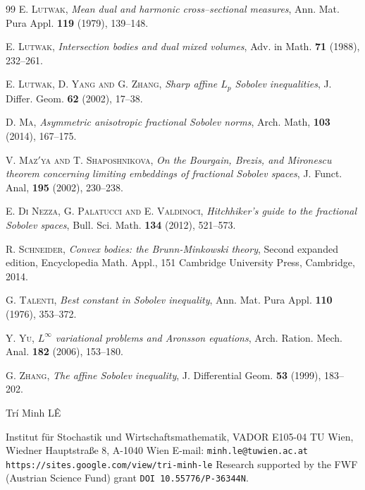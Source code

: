 \documentclass[11pt, reqno]{article}
\theoremstyle{definition}
\numberwithin{equation}{section}
\begin{document}
\begin{thebibliography}{99}
\textsc{E. Lutwak},
\emph{Mean dual and harmonic cross--sectional measures},
Ann. Mat. Pura Appl. \textbf{119} (1979), 139--148.

\textsc{E. Lutwak},
\emph{Intersection bodies and dual mixed volumes},
Adv. in Math. \textbf{71} (1988), 232--261.

\textsc{E. Lutwak, D. Yang and G. Zhang},
\emph{Sharp affine $L_p$ Sobolev inequalities},
J. Differ. Geom. \textbf{62} (2002), 17--38.

\textsc{D. Ma},
\emph{Asymmetric anisotropic fractional Sobolev norms},
Arch. Math, \textbf{103} (2014), 167--175.

\textsc{V. Maz$'$ya and T. Shaposhnikova,}
\emph{On the {B}ourgain, {B}rezis, and {M}ironescu theorem concerning limiting embeddings of fractional {S}obolev spaces},
J. Funct. Anal, \textbf{195} (2002), 230--238.

\textsc{E. Di Nezza, G. Palatucci and E. Valdinoci},
\emph{Hitchhiker{'}s guide to the fractional Sobolev spaces},
Bull. Sci. Math. \textbf{134} (2012), 521--573.

\textsc{R. Schneider},
\emph{Convex bodies: the Brunn-Minkowski theory},
Second expanded edition, Encyclopedia Math. Appl., 151
Cambridge University Press, Cambridge, 2014.

\textsc{G. Talenti},
\emph{Best constant in Sobolev inequality},
Ann. Mat. Pura Appl. \textbf{110} (1976), 353--372.

\textsc{Y. Yu},
\emph{{$L^\infty$} variational problems and {A}ronsson equations},
Arch. Ration. Mech. Anal. \textbf{182} (2006), 
153--180.

\textsc{G. Zhang},
\emph{The affine {S}obolev inequality},
J. Differential Geom. \textbf{53} (1999), 183--202.

\end{thebibliography}


\noindent Tr\'i Minh L\^E

\medskip

\noindent Institut f\"{u}r Stochastik und Wirtschaftsmathematik, VADOR E105-04
\newline TU Wien, Wiedner Hauptstra{\ss }e 8, A-1040 Wien\medskip
\newline\noindent E-mail: \texttt{minh.le@tuwien.ac.at}
\newline\noindent\texttt{https://sites.google.com/view/tri-minh-le} \smallskip\newline
\noindent Research supported by the FWF (Austrian Science Fund) grant \texttt{DOI 10.55776/P-36344N}.
\end{document}
